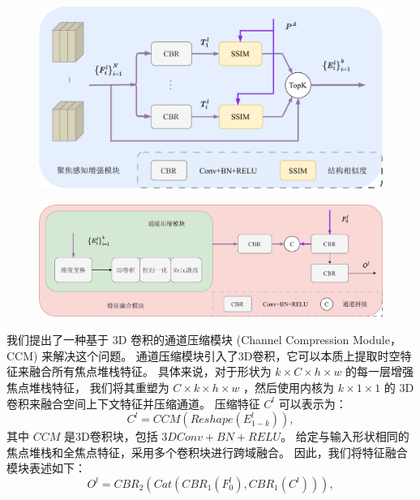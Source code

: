 %
%
\begin{figure}[!ht]
	\centering
	\includegraphics[width=0.90\linewidth]{figures/chapter3/fpe}
	\label{cpt3_fig1:fpe}
\end{figure}
%
%
%
%
\begin{figure}[!ht]
	\centering
	\includegraphics[width=0.95\linewidth]{figures/chapter3/ccm}
	\label{cpt3_fig1:ccm}
\end{figure}
%
%
%
\par
%
%
我们提出了一种基于 3D 卷积的通道压缩模块 (Channel Compression Module，CCM) 来解决这个问题。 
通道压缩模块引入了3D卷积，它可以本质上提取时空特征来融合所有焦点堆栈特征。
具体来说，对于形状为 $ k \times C \times h \times w $ 的每一层增强焦点堆栈特征，
我们将其重塑为 $ C \times  k \times  h \times w $ ，然后使用内核为 $ k \times 1 \times 1 $  的 3D 卷积来融合空间上下文特征并压缩通道。 压缩特征 $ C^{l} $ 可以表示为：
%
%
\begin{equation}
	C^{l} = CCM \left ( Reshape \left ( E_{1-k}^{l} \right ) \right ) ,
\end{equation}
%
%
其中 $CCM$ 是3D卷积块，包括 $3DConv+BN+RELU$。 给定与输入形状相同的焦点堆栈和全焦点特征，采用多个卷积块进行跨域融合。 因此，我们将特征融合模块表述如下：
%
%
%	
\begin{equation}
	O^{l}=CBR_{2}\left (Cat \left (CBR_{1} \left (F_{0}^{l} \right ),CBR_{1} \left (C^{l} \right ) \right ) \right ),
\end{equation}

